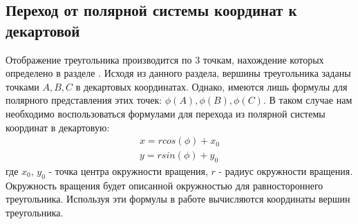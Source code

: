 \documentclass[14pt]{extarticle}
\begin{document}
{\begin{spacing}{1.5}
{        \subsection{Переход от полярной системы координат к декартовой}
        \label{sec:polar}
        \par
    }
    Отображение треугольника производится по 3 точкам, нахождение которых определено в разделе \hyperref[sec:trianglepoints]. Исходя из данного раздела, вершины треугольника заданы точками $A, B, C$ в декартовых координатах. Однако, имеются лишь формулы для полярного представления этих точек: $\phi(A), \phi(B), \phi(C)$. В таком случае нам необходимо воспользоваться формулами для перехода из полярной системы координат в декартовую:
    \[
        \begin{array}{c}
            x = rcos(\phi) + x_0 \\
            y = rsin(\phi) + y_0
        \end{array}
    \]
    где $x_0$, $y_0$ - точка центра окружности вращения, $r$ - радиус окружности вращения. Окружность вращения будет описанной окружностью для равностороннего треугольника. Используя эти формулы в работе вычисляются координаты вершин треугольника.
    {
        \par
        \vspace{1em}
}
\end{spacing}}
\end{document}
